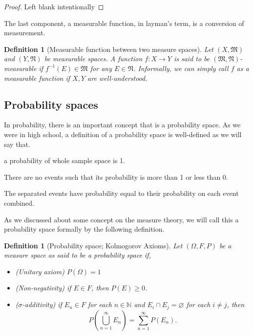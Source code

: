 \documentclass[12pt, a4paper]{report}
\newtheorem{definition}[theorem]{Definition}
\begin{document}
    \begin{proof} Left blank intentionally
    \end{proof}

    The last component, a measurable function, in layman's term, is a conversion of measurement.

    \begin{definition}[Measurable function between two measure spaces] Let $(X,\mathfrak{M})$ and $(Y, \mathfrak{N})$ be measurable spaces. A function $f: X \to Y$ is said to be $(\mathfrak{M}, \mathfrak{N})$-measurable if $f^{-1}(E) \in \mathfrak{M}$ for any $E \in \mathfrak{N}$. Informally, we can simply call $f$ as a measurable function if $X,Y$ are well-understood.
    \end{definition}

    \subsection{Probability spaces}

    In probability, there is an important concept that is a probability space. As we were in high school, a definition of a probability space is well-defined as we will say that.

    \begin{todolist}
        \item a probability of whole sample space is 1.
        \item There are no events such that its probability is more than 1 or less than 0.
        \item The separated events have probability equal to their probability on each event combined.
    \end{todolist}

    As we discussed about some concept on the measure theory, we will call this a probability space formally by the following definition.

    \begin{definition}[Probability space; Kolmogorov Axioms] Let $(\Omega, F, P)$ be a measure space as said to be a probability space if,
        \begin{itemize}
            \item (Unitary axiom) $P(\Omega) = 1$
            \item (Non-negativity) if $E \in F$, then $P(E) \geq 0$.
            \item ($\sigma$-additivity) if $E_n \in F$ for each $n \in \mathbb{N}$ and $E_i \cap E_j = \varnothing$ for each $i \neq j$, then $$P\left(\bigcup_{n=1}^\infty E_n\right) = \sum_{n=1}^\infty P(E_n).$$
        \end{itemize}
    \end{definition}
\end{document}
